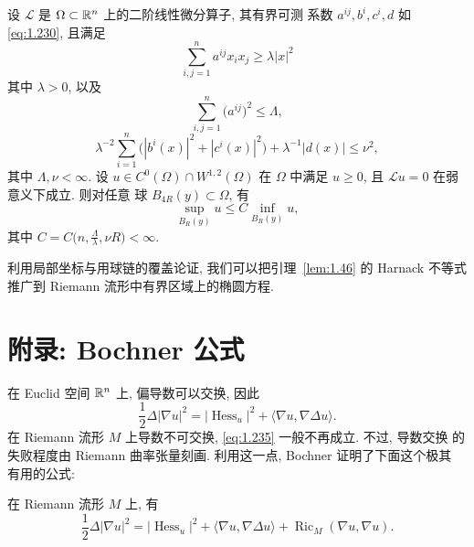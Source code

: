 \begin{lemma}
\label{lem:1.46}
设 $\mathcal{L}$ 是 $\Omega\subset\mathbb{R}^n$ 上的二阶线性微分算子, 其有界可测
系数 $a^{ij},b^{i},c^{i},d$ 如 \eqref{eq:1.230}, 且满足
\begin{equation}
\sum_{i,j=1}^{n}a^{ij}x_ix_j\geq\lambda|x|^{2}
\label{eq:1.231}
\end{equation}
其中 $\lambda>0$, 以及
\begin{equation}
\sum_{i,j=1}^{n}\bigl(a^{ij}\bigr)^{2}\leq\Lambda,
\label{eq:1.232}
\end{equation}
\begin{equation}
\lambda^{-2}\sum_{i=1}^{n}
 \bigl(|b^{i}(x)|^{2}+|c^{i}(x)|^{2}\bigr)+\lambda^{-1}|d(x)|\leq\nu^{2},
\label{eq:1.233}
\end{equation}
其中 $\Lambda,\nu<\infty$. 设 $u\in C^{0}(\Omega)\cap W^{1,2}(\Omega)$
在 $\Omega$ 中满足 $u\geq0$, 且 $\mathcal{L}u=0$ 在弱意义下成立. 则对任意
球 $B_{4R}(y)\subset\Omega$, 有
\begin{equation}
\sup_{B_R(y)}u\leq C\inf_{B_R(y)}u,
\label{eq:1.234}
\end{equation}
其中 $C=C\bigl(n,\frac{\Lambda}{\lambda},\nu R\bigr)<\infty$.
\end{lemma}

利用局部坐标与用球链的覆盖论证, 我们可以把引理~\ref{lem:1.46} 的 Harnack
不等式推广到 Riemann 流形中有界区域上的椭圆方程.

\section*{附录: Bochner 公式}
\label{sec:1.app-bochner}

在 Euclid 空间 $\mathbb{R}^n$ 上, 偏导数可以交换, 因此
\begin{equation}
\frac12\Delta|\nabla u|^{2}
 =|\operatorname{Hess}_u|^{2}
 +\langle\nabla u,\nabla\Delta u\rangle.
\label{eq:1.235}
\end{equation}
在 Riemann 流形 $M$ 上导数不可交换, \eqref{eq:1.235} 一般不再成立. 不过, 导数交换
的失败程度由 Riemann 曲率张量刻画. 利用这一点, Bochner 证明了下面这个极其
有用的公式:

\begin{proposition}[Bochner 公式]
\label{prop:1.47}
在 Riemann 流形 $M$ 上, 有
\begin{equation}
\frac12\Delta|\nabla u|^{2}
 =|\operatorname{Hess}_u|^{2}
 +\langle\nabla u,\nabla\Delta u\rangle
 +\operatorname{Ric}_M(\nabla u,\nabla u).
\label{eq:1.236}
\end{equation}
\end{proposition}

